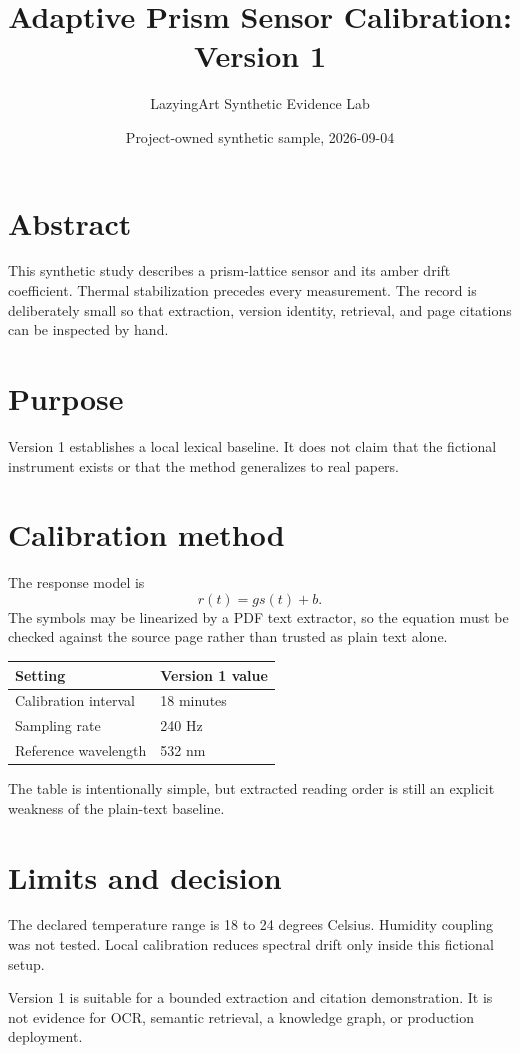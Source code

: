 \documentclass[11pt]{article}
\title{Adaptive Prism Sensor Calibration: Version 1}
\author{LazyingArt Synthetic Evidence Lab}
\date{Project-owned synthetic sample, 2026-09-04}
\begin{document}
\maketitle
\begin{center}
\end{center}

\section*{Abstract}
This synthetic study describes a prism-lattice sensor and its amber drift
coefficient. Thermal stabilization precedes every measurement. The record is
deliberately small so that extraction, version identity, retrieval, and page
citations can be inspected by hand.

\section*{Purpose}
Version 1 establishes a local lexical baseline. It does not claim that the
fictional instrument exists or that the method generalizes to real papers.

\newpage
\section*{Calibration method}
The response model is
\[
  r(t) = g s(t) + b.
\]
The symbols may be linearized by a PDF text extractor, so the equation must be
checked against the source page rather than trusted as plain text alone.

\begin{center}
\begin{tabular}{ll}
\toprule
Setting & Version 1 value \\
\midrule
Calibration interval & 18 minutes \\
Sampling rate & 240 Hz \\
Reference wavelength & 532 nm \\
\bottomrule
\end{tabular}
\end{center}

The table is intentionally simple, but extracted reading order is still an
explicit weakness of the plain-text baseline.

\newpage
\section*{Limits and decision}
The declared temperature range is 18 to 24 degrees Celsius. Humidity coupling
was not tested. Local calibration reduces spectral drift only inside this
fictional setup.

Version 1 is suitable for a bounded extraction and citation demonstration. It
is not evidence for OCR, semantic retrieval, a knowledge graph, or production
deployment.
\end{document}
